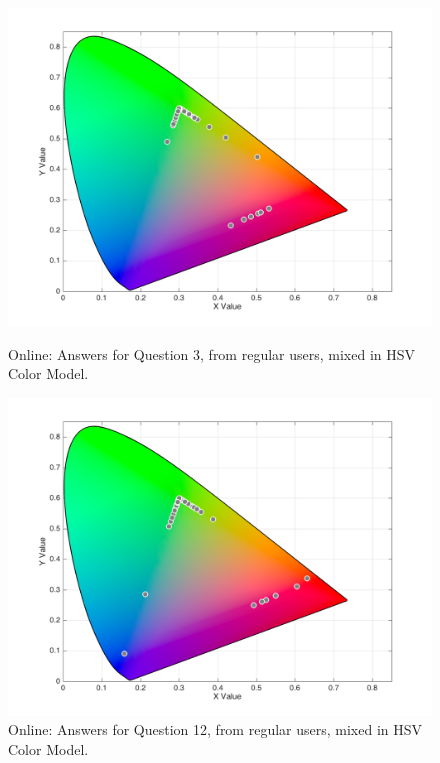 \begin{figure}[htbp]
  \centering
  \vspace{-15pt}
  \begin{minipage}{0.4\textwidth}
    \centering
    \includegraphics[width=\textwidth]{images/results/3_online_HSVresponses.png}
    \caption[Online: Answers for Question 3, from regular users, mixed in HSV Color Model.]{Online: Answers for Question 3, from regular users, mixed in HSV Color Model.}
    \label{fig:onlinehsvregular_3}
  \end{minipage}
  \begin{minipage}{0.4\textwidth}
    \centering
    \includegraphics[width=\textwidth]{images/results/12_online_HSVresponses.png}
    \caption[Online: Answers for Question 12, from regular users, mixed in HSV Color Model.]{Online: Answers for Question 12, from regular users, mixed in HSV Color Model.}
    \label{fig:onlinehsvregular_12}
  \end{minipage}
  \vspace{-5pt}
\end{figure}
%
